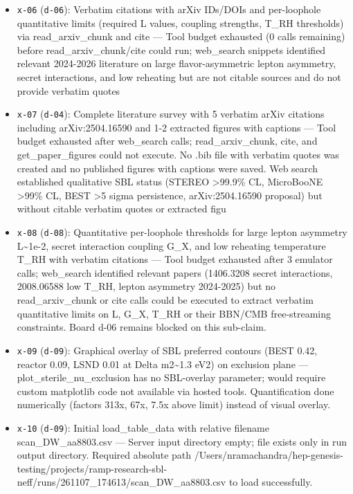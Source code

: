 \documentclass[11pt,a4paper]{article}
\begin{document}
\begin{itemize}
  \item \texttt{x-06} (\texttt{d-06}): Verbatim citations with arXiv IDs/DOIs and per-loophole quantitative limits (required L values, coupling strengths, T\_RH thresholds) via read\_arxiv\_chunk and cite --- Tool budget exhausted (0 calls remaining) before read\_arxiv\_chunk/cite could run; web\_search snippets identified relevant 2024-2026 literature on large flavor-asymmetric lepton asymmetry, secret interactions, and low reheating but are not citable sources and do not provide verbatim quotes
  \item \texttt{x-07} (\texttt{d-04}): Complete literature survey with 5 verbatim arXiv citations including arXiv:2504.16590 and 1-2 extracted figures with captions --- Tool budget exhausted after web\_search calls; read\_arxiv\_chunk, cite, and get\_paper\_figures could not execute. No .bib file with verbatim quotes was created and no published figures with captions were saved. Web search established qualitative SBL status (STEREO \textgreater{}99.9\% CL, MicroBooNE \textgreater{}99\% CL, BEST \textgreater{}5 sigma persistence, arXiv:2504.16590 proposal) but without citable verbatim quotes or extracted figu
  \item \texttt{x-08} (\texttt{d-08}): Quantitative per-loophole thresholds for large lepton asymmetry L\textasciitilde{}1e-2, secret interaction coupling G\_X, and low reheating temperature T\_RH with verbatim citations --- Tool budget exhausted after 3 emulator calls; web\_search identified relevant papers (1406.3208 secret interactions, 2008.06588 low T\_RH, lepton asymmetry 2024-2025) but no read\_arxiv\_chunk or cite calls could be executed to extract verbatim quantitative limits on L, G\_X, T\_RH or their BBN/CMB free-streaming constraints. Board d-06 remains blocked on this sub-claim.
  \item \texttt{x-09} (\texttt{d-09}): Graphical overlay of SBL preferred contours (BEST 0.42, reactor 0.09, LSND 0.01 at Delta m2\textasciitilde{}1.3 eV2) on exclusion plane --- plot\_sterile\_nu\_exclusion has no SBL-overlay parameter; would require custom matplotlib code not available via hosted tools. Quantification done numerically (factors 313x, 67x, 7.5x above limit) instead of visual overlay.
  \item \texttt{x-10} (\texttt{d-09}): Initial load\_table\_data with relative filename scan\_DW\_aa8803.csv --- Server input directory empty; file exists only in run output directory. Required absolute path /Users/nramachandra/hep-genesis-testing/projects/ramp-research-sbl-neff/runs/261107\_174613/scan\_DW\_aa8803.csv to load successfully.

\end{itemize}
\end{document}
